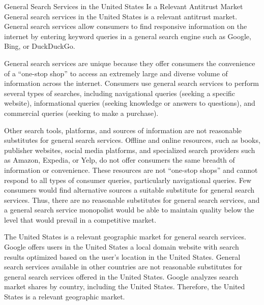 \documentclass[11pt,b5paper]{scrartcl}
\begin{document}



General Search Services in the United States Is a Relevant Antitrust
Market
General search services in the United States is a relevant antitrust market. General
search services allow consumers to find responsive information on the internet by entering
keyword queries in a general search engine such as Google, Bing, or DuckDuckGo.


General search services are unique because they offer consumers the convenience
of a “one-stop shop” to access an extremely large and diverse volume of information across the
internet. Consumers use general search services to perform several types of searches, including
navigational queries (seeking a specific website), informational queries (seeking knowledge or
answers to questions), and commercial queries (seeking to make a purchase).


Other search tools, platforms, and sources of information are not reasonable
substitutes for general search services. Offline and online resources, such as books, publisher
websites, social media platforms, and specialized search providers such as Amazon, Expedia, or
Yelp, do not offer consumers the same breadth of information or convenience. These resources
are not “one-stop shops” and cannot respond to all types of consumer queries, particularly
navigational queries. Few consumers would find alternative sources a suitable substitute for
general search services. Thus, there are no reasonable substitutes for general search services, and
a general search service monopolist would be able to maintain quality below the level that would
prevail in a competitive market.


The United States is a relevant geographic market for general search services.
Google offers users in the United States a local domain website with search results optimized
based on the user’s location in the United States. General search services available in other
countries are not reasonable substitutes for general search services offered in the United States.
Google analyzes search market shares by country, including the United States. Therefore, the
United States is a relevant geographic market.

\end{document}
